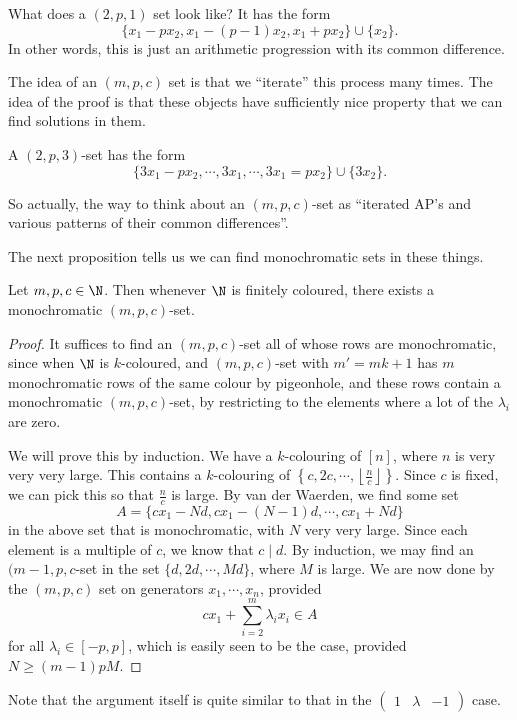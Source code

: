 \documentclass[a4paper]{article}
\begin{document}
\begin{eg}
  What does a $(2, p, 1)$ set look like? It has the form
  \[
    \{x_1 - p x_2, x_1 - (p - 1) x_2, x_1 + p x_2\} \cup \{x_2\}.
  \]
  In other words, this is just an arithmetic progression with its common difference.
\end{eg}
The idea of an $(m, p, c)$ set is that we ``iterate'' this process many times. The idea of the proof is that these objects have sufficiently nice property that we can find solutions in them.

\begin{eg}
  A $(2, p, 3)$-set has the form
  \[
    \{3x_1 - p x_2, \cdots, 3 x_1, \cdots, 3 x_1 = p x_2\} \cup \{3 x_2\}.
  \]
\end{eg}
So actually, the way to think about an $(m, p, c)$-set as ``iterated AP's and various patterns of their common differences''.

The next proposition tells us we can find monochromatic sets in these things.

\begin{prop}
  Let $m, p, c \in \N$. Then whenever $\N$ is finitely coloured, there exists a monochromatic $(m, p, c)$-set.
\end{prop}

\begin{proof}
  It suffices to find an $(m, p, c)$-set all of whose rows are monochromatic, since when $\N$ is $k$-coloured, and $(m, p, c)$-set with $m' = mk + 1$ has $m$ monochromatic rows of the same colour by pigeonhole, and these rows contain a monochromatic $(m, p, c)$-set, by restricting to the elements where a lot of the $\lambda_i$ are zero.

  We will prove this by induction. We have a $k$-colouring of $[n]$, where $n$ is very very very large. This contains a $k$-colouring of $\left\{c, 2c, \cdots, \left\lfloor \frac{n}{c}\right\rfloor\right\}$. Since $c$ is fixed, we can pick this so that $\frac{n}{c}$ is large. By van der Waerden, we find some set
  \[
    A = \{c x_1 - Nd, cx_1 - (N - 1)d, \cdots, cx_1 + Nd \}
  \]
  in the above set that is monochromatic, with $N$ very very large. Since each element is a multiple of $c$, we know that $c \mid d$. By induction, we may find an $(m -1, p, c$-set in the set $\{d, 2d, \cdots, Md\}$, where $M$ is large. We are now done by the $(m, p, c)$ set on generators $x_1, \cdots, x_n$, provided
  \[
    c x_1 + \sum_{i = 2}^m \lambda_i x_i \in A
  \]
  for all $\lambda_i \in [-p, p]$, which is easily seen to be the case, provided $N \geq (m - 1) pM$.
\end{proof}
Note that the argument itself is quite similar to that in the $\begin{pmatrix}1 & \lambda & -1\end{pmatrix}$ case.
\end{document}
